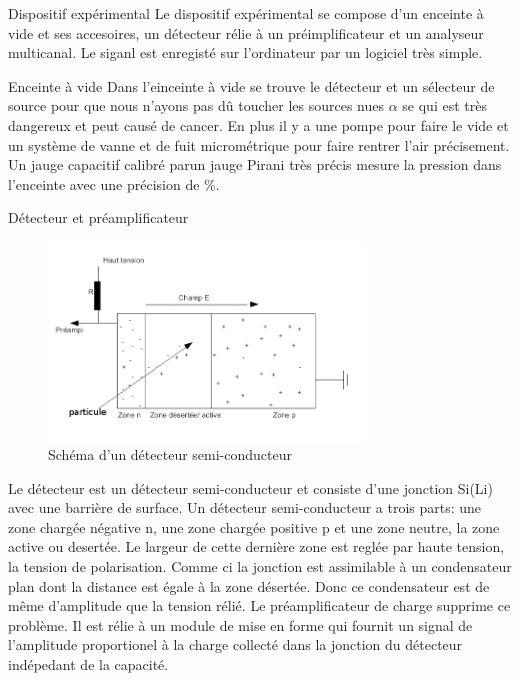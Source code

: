 \documentclass[a4paper,11pt,liststotocnumbered,bibtotocnumbered]{scrartcl}
\begin{document}
 \begin{section}{Dispositif expérimental}
  Le dispositif expérimental se compose d'un enceinte à vide et ses accesoires, un détecteur rélie à un préimplificateur et un analyseur multicanal. Le siganl est enregisté sur l'ordinateur par un logiciel très simple.
  \begin{subsection}{Enceinte à vide}
   Dans l'einceinte à vide se trouve le détecteur et un sélecteur de source pour que nous n'ayons pas dû toucher les sources nues $\alpha$ se qui est très dangereux et peut causé de cancer. En plus il y a une pompe pour faire le vide et un système de vanne et de fuit micrométrique pour faire rentrer l'air précisement. Un jauge capacitif calibré parun jauge Pirani très précis mesure la pression dans l'enceinte avec une précision de \unit[0,2]{\%}.  
  \end{subsection}

  \begin{subsection}{Détecteur et préamplificateur}
\enlargethispage{1cm}
   \begin{figure}[hbt]
    \begin{center}
     \includegraphics[width=0.75\textwidth]{Bilder/detecteur.png}
    \end{center}
    \caption{Schéma d'un détecteur semi-conducteur}
   \end{figure}
   Le détecteur est un détecteur semi-conducteur et consiste d'une jonction Si(Li) avec une barrière de surface. Un détecteur semi-conducteur a trois parts: une zone chargée négative n, une zone chargée positive p  et une zone neutre, la zone active ou desertée. Le largeur de cette dernière zone est reglée par haute tension, la tension de polarisation. Comme ci la jonction est assimilable à un condensateur plan dont la distance est égale à la zone désertée. Donc ce condensateur est de même d'amplitude que la tension rélié.
   Le préamplificateur de charge supprime ce problème. Il est rélie à un module de mise en forme qui fournit un signal de l'amplitude proportionel à la charge collecté dans la jonction du détecteur indépedant de la capacité.
  \end{subsection}


\end{section}
\end{document}
